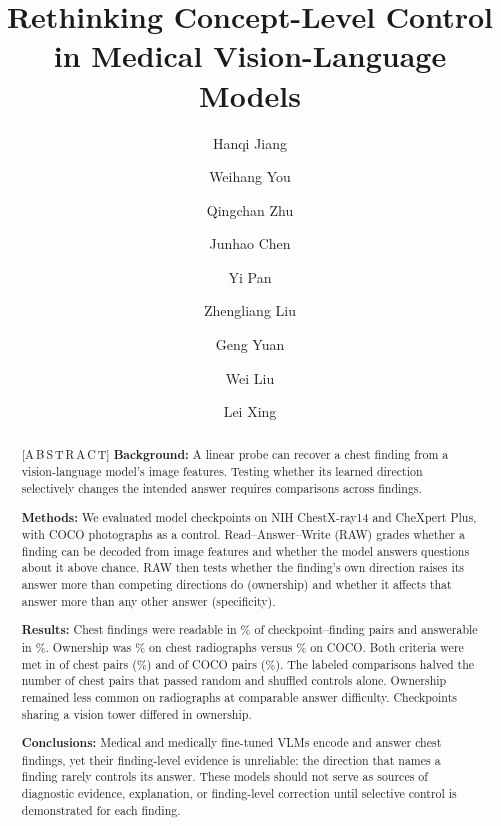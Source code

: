 \documentclass[a4paper,fleqn]{cas-dc}
\begin{document}
\let\WriteBookmarks\relax
\def\floatpagepagefraction{1}
\def\textpagefraction{.001}


\title [mode = title]{Rethinking Concept-Level Control in Medical Vision-Language Models}

\author[1,2]{Hanqi Jiang}
\fnmark[1]
\author[1]{Weihang You}
\fnmark[1]
\author[1]{Qingchan Zhu}
\author[1]{Junhao Chen}
\author[1]{Yi Pan}
\author[1]{Zhengliang Liu}
\author[1]{Geng Yuan}
\author[3]{Wei Liu}
\author[2]{Lei Xing}
\cormark[1]



\begin{abstract}[A\,B\,S\,T\,R\,A\,C\,T]
\textbf{Background:} A linear probe can recover a chest finding from a vision-language model's image features. Testing whether its learned direction selectively changes the intended answer requires comparisons across findings.

\noindent\textbf{Methods:} We evaluated \cfCheckpoints{} model checkpoints on NIH ChestX-ray14 and CheXpert Plus, with COCO photographs as a control. Read--Answer--Write (RAW) grades whether a finding can be decoded from image features and whether the model answers questions about it above chance. RAW then tests whether the finding's own direction raises its answer more than competing directions do (ownership) and whether it affects that answer more than any other answer (specificity).

\noindent\textbf{Results:} Chest findings were readable in \cfChestReadablePct{}\% of checkpoint--finding pairs and answerable in \cfChestAnswerablePct{}\%. Ownership was \cfChestOwnedPct{}\% on chest radiographs versus \cfCocoOwnedPct{}\% on COCO. Both criteria were met in \jnTwoWayChest{} of \cfChestCellsN{} chest pairs (\jnTwoWayChestPct{}\%) and \jnTwoWayCoco{} of \cfCocoCells{} COCO pairs (\jnTwoWayCocoPct{}\%). The labeled comparisons halved the number of chest pairs that passed random and shuffled controls alone. Ownership remained less common on radiographs at comparable answer difficulty. Checkpoints sharing a vision tower differed in ownership.

\noindent\textbf{Conclusions:} Medical and medically fine-tuned VLMs encode and answer chest findings, yet their finding-level evidence is unreliable: the direction that names a finding rarely controls its answer. These models should not serve as sources of diagnostic evidence, explanation, or finding-level correction until selective control is demonstrated for each finding.
\end{abstract}
\end{document}
